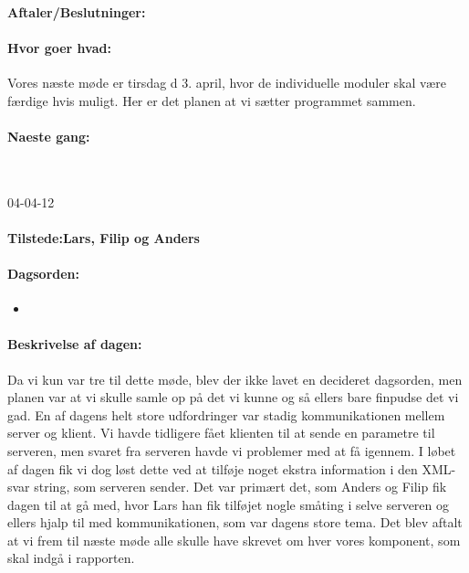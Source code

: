 \documentclass[a4paper,10pt,titlepage]{article}
\begin{document}
		\paragraph{Aftaler/Beslutninger:}
		
		\paragraph{Hvor goer hvad:}
		Vores næste møde er tirsdag d 3. april, hvor de individuelle moduler skal være færdige hvis muligt. Her er det planen at vi sætter programmet sammen.
		\paragraph{Naeste gang:}\mbox{}\\
		
		\begin{center}
		04-04-12
		\end{center}
		
		\paragraph{Tilstede:Lars, Filip og Anders}
		\paragraph{Dagsorden:}
		\begin{itemize}
					\item 
					
		\end{itemize}
		
		\paragraph{Beskrivelse af dagen:}
		Da vi kun var tre til dette møde, blev der ikke lavet en decideret dagsorden, men planen var at vi skulle samle op på det vi kunne og så ellers bare finpudse det vi gad. En af dagens helt store udfordringer var stadig kommunikationen mellem server og klient. Vi havde tidligere fået klienten til at sende en parametre til serveren, men svaret fra serveren havde vi problemer med at få igennem. I løbet af dagen fik vi dog løst dette ved at tilføje noget ekstra information i den XML-svar string, som serveren sender. Det var primært det, som Anders og Filip fik dagen til at gå med, hvor Lars han fik tilføjet nogle småting i selve serveren og ellers hjalp til med kommunikationen, som var dagens store tema. Det blev aftalt at vi frem til næste møde alle skulle have skrevet om hver vores komponent, som skal indgå i rapporten. 
\end{document}
